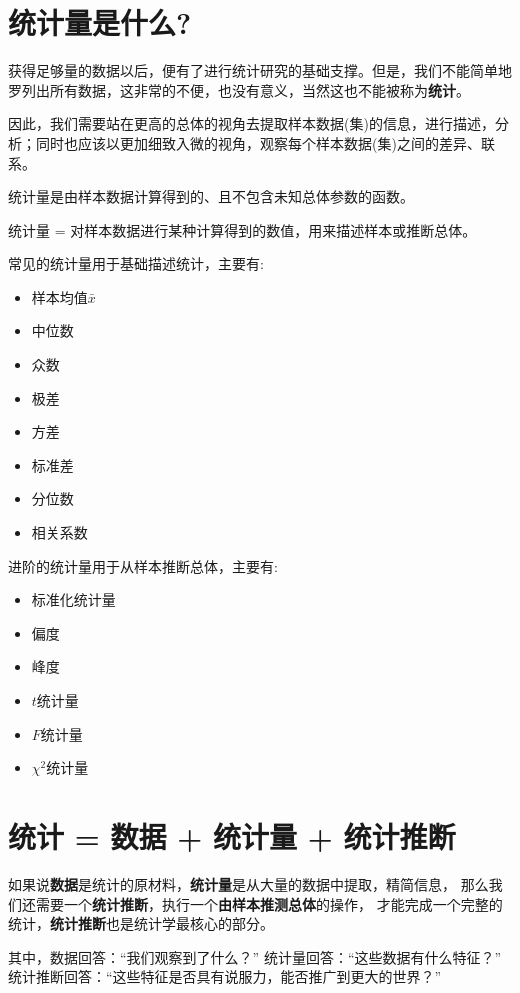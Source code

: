 \documentclass[lang=cn,10pt]{elegantbook}
\begin{document}
\section{统计量是什么?}
获得足够量的数据以后，便有了进行统计研究的基础支撑。但是，我们不能简单地罗列出所有数据，这非常的不便，也没有意义，当然这也不能被称为\textbf{统计}。

因此，我们需要站在更高的总体的视角去提取样本数据(集)的信息，进行描述，分析；同时也应该以更加细致入微的视角，观察每个样本数据(集)之间的差异、联系。
\begin{definition}[统计量] 
统计量是由样本数据计算得到的、且不包含未知总体参数的函数。

统计量 = 对样本数据进行某种计算得到的数值，用来描述样本或推断总体。
\end{definition}

常见的统计量用于基础描述统计，主要有:
\begin{itemize}
  \item 样本均值$\bar{x}$
  \item 中位数
  \item 众数
  \item 极差
  \item 方差
  \item 标准差
  \item 分位数
  \item 相关系数
\end{itemize}

进阶的统计量用于从样本推断总体，主要有:
\begin{itemize}
  \item 标准化统计量
  \item 偏度
  \item 峰度
  \item $t$统计量
  \item $F$统计量
  \item $\chi^2$统计量
\end{itemize}



\section{统计 = 数据 + 统计量 + 统计推断}
如果说\textbf{数据}是统计的原材料，\textbf{统计量}是从大量的数据中提取，精简信息，
那么我们还需要一个\textbf{统计推断}，执行一个\textbf{由样本推测总体}的操作，
才能完成一个完整的统计，\textbf{统计推断}也是统计学最核心的部分。

其中，数据回答：“我们观察到了什么？”
统计量回答：“这些数据有什么特征？”
统计推断回答：“这些特征是否具有说服力，能否推广到更大的世界？”
\end{document}

